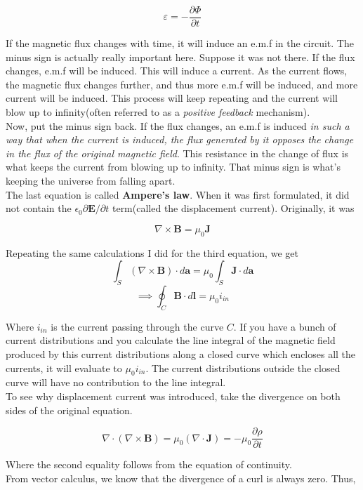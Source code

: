 \documentclass[12pt]{article}
\begin{document}
\[\varepsilon = -\frac{\partial \Phi}{\partial t}\]

If the magnetic flux changes with time, it will induce an e.m.f in the circuit. The minus sign is actually really important here. Suppose it was not there. 
If the flux changes, e.m.f will be induced. This will induce a current. As the current flows, the magnetic flux changes further, and thus more e.m.f will be induced, and more current will be induced. 
This process will keep repeating and the current will blow up to infinity(often referred to as a \textit{positive feedback} mechanism).\\
Now, put the minus sign back. If the flux changes, an e.m.f is induced \textit{in such a way that when the current is induced, the flux generated by it opposes the change in the flux of the original magnetic field}.
This resistance in the change of flux is what keeps the current from blowing up to infinity. That minus sign is what's keeping the universe from falling apart. \\

The last equation is called \textbf{Ampere's law}. When it was first formulated, it did not contain the $\epsilon_0 \partial \mathbf{E}/\partial t$ term(called the displacement current). Originally, it was

\[\nabla \times \mathbf{B}= \mu_0 \mathbf{J}\]

Repeating the same calculations I did for the third equation, we get 
\[\int_S (\nabla \times \mathbf{B})\cdot d\mathbf{a} = \mu_0 \int_S \mathbf{J}\cdot d\mathbf{a}\] 
\[\implies \oint_{C}\mathbf{B}\cdot d\mathbf{l}=\mu_0 i_{in}\]

Where $i_{in}$ is the current passing through the curve $C$.
If you have a bunch of current distributions and you calculate the line integral of the magnetic field produced by this current distributions 
along a closed curve which encloses all the currents, it will evaluate to $\mu_0 i_{in}$. The current distributions outside 
the closed curve will have no contribution to the line integral. \\
To see why displacement current was introduced, take the divergence on both sides of the original equation. 

\[\nabla \cdot(\nabla \times \mathbf{B})=\mu_0(\nabla\cdot \mathbf{J})=-\mu_0\frac{\partial \rho}{\partial t}\]

Where the second equality follows from the equation of continuity.\\
From vector calculus, we know that the divergence of a curl is always zero. Thus, 
\end{document}
